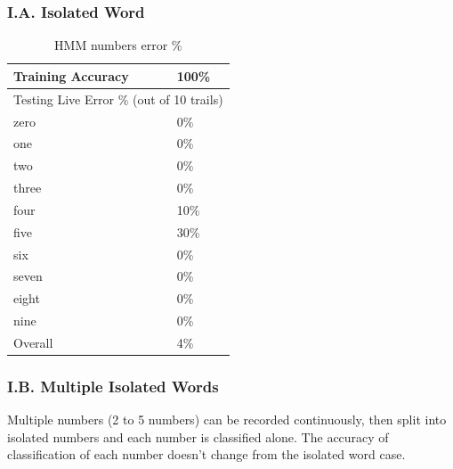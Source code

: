\documentclass[12pt, a4paper, twoside]{report}
\begin{document}
\subsubsection{I.A. Isolated Word}
\begin{table}[H]
\centering
\begin{tabular}{|l|l|}
\hline
Training Accuracy & 100\% \\ \hline
\multicolumn{2}{|l|}{Testing Live Error \% (out of 10 trails)} \\ \hline
zero & 0\% \\ \hline
one & 0\% \\ \hline
two & 0\% \\ \hline
three & 0\% \\ \hline
four & 10\% \\ \hline
five & 30\% \\ \hline
six & 0\% \\ \hline
seven & 0\% \\ \hline
eight & 0\% \\ \hline
nine & 0\% \\ \hline
Overall & 4\% \\ \hline
\end{tabular}
\caption{HMM numbers error \%}
\label{tab:hmm-numbers}
\end{table}

\subsubsection{I.B. Multiple Isolated Words}
Multiple numbers (2 to 5 numbers) can be recorded continuously, then split into isolated numbers and each number is classified alone. The accuracy of classification of each number doesn't change from the isolated word case.
\end{document}
